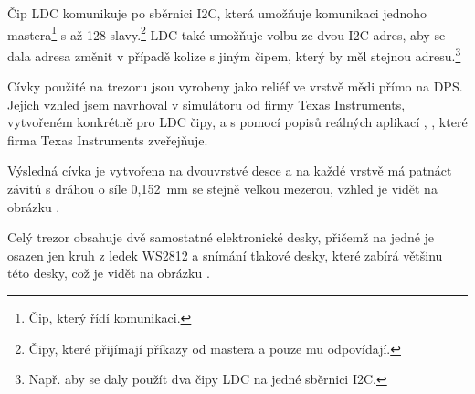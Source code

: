 Čip LDC komunikuje po sběrnici I2C, která umožňuje komunikaci jednoho mastera\footnote{Čip, který řídí komunikaci.} s až 128 slavy.\footnote{Čipy, které přijímají příkazy od mastera a pouze mu odpovídají.} 
LDC také umožňuje volbu ze dvou I2C adres, aby se dala adresa změnit v případě 
kolize s jiným čipem, který by měl stejnou adresu.\footnote{Např. aby se daly použít dva čipy LDC na jedné sběrnici I2C.}

\newpage

Cívky použité na trezoru jsou vyrobeny jako reliéf ve vrstvě mědi přímo na DPS. Jejich vzhled jsem navrhoval v simulátoru od firmy Texas Instruments, 
vytvořeném konkrétně pro LDC čipy, a s pomocí popisů reálných aplikací \parencite{LDC-cd0}, \parencite{LDC-cd1}, které firma Texas Instruments zveřejňuje.


Výsledná cívka je vytvořena na dvouvrstvé desce a na každé vrstvě má patnáct závitů s dráhou o síle 0,152~mm se stejně velkou mezerou, 
vzhled je vidět na obrázku .

Celý trezor obsahuje dvě samostatné elektronické desky, přičemž na jedné je osazen jen kruh z ledek WS2812 a snímání tlakové desky, které zabírá 
většinu této desky, což je vidět na obrázku .

\newpage
